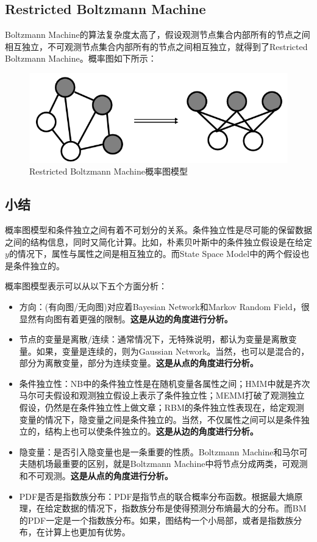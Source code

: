 \documentclass[a4paper]{article}
\begin{document}
\subsection{Restricted Boltzmann Machine}
Boltzmann Machine的算法复杂度太高了，假设观测节点集合内部所有的节点之间相互独立，不可观测节点集合内部所有的节点之间相互独立，就得到了Restricted Boltzmann Machine。概率图如下所示：
\begin{figure}[H]
    \centering
    \includegraphics[width=.55\textwidth]{微信图片_20200229000824.png}
    \caption{Restricted Boltzmann Machine概率图模型}
    \label{fig:my_label_1}
\end{figure}

\subsection{小结}
概率图模型和条件独立之间有着不可划分的关系。条件独立性是尽可能的保留数据之间的结构信息，同时又简化计算。比如，朴素贝叶斯中的条件独立假设是在给定$y$的情况下，属性与属性之间是相互独立的。而State Space Model中的两个假设也是条件独立的。

概率图模型表示可以从以下五个方面分析：
\begin{itemize}
    \item 方向：(有向图/无向图)对应着Bayesian Network和Markov Random Field，很显然有向图有着更强的限制。\textbf{这是从边的角度进行分析。}
    \item 节点的变量是离散/连续：通常情况下，无特殊说明，都认为变量是离散变量。如果，变量是连续的，则为Gaussian Network。当然，也可以是混合的，部分为离散变量，部分为连续变量。\textbf{这是从点的角度进行分析。}
    \item 条件独立性：NB中的条件独立性是在随机变量各属性之间；HMM中就是齐次马尔可夫假设和观测独立假设上表示了条件独立性；MEMM打破了观测独立假设，仍然是在条件独立性上做文章；RBM的条件独立性表现在，给定观测变量的情况下，隐变量之间是条件独立的。当然，不仅属性之间可以是条件独立的，结构上也可以使条件独立的。\textbf{这是从边的角度进行分析。}
    \item 隐变量：是否引入隐变量也是一条重要的性质。Boltzmann Machine和马尔可夫随机场最重要的区别，就是Boltzmann Machine中将节点分成两类，可观测和不可观测。\textbf{这是从点的角度进行分析。}
    \item PDF是否是指数族分布：PDF是指节点的联合概率分布函数。根据最大熵原理，在给定数据的情况下，指数族分布是使得预测分布熵最大的分布。而BM的PDF一定是一个指数族分布。如果，图结构一个小局部，或者是指数族分布，在计算上也更加有优势。
\end{itemize}
\end{document}

